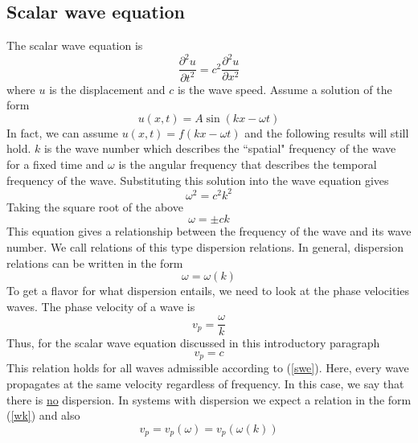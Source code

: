 \documentclass{article}
\begin{document}
\subsection{Scalar wave equation}
The scalar wave equation is 
\begin{equation} \label{swe}
\frac{\partial^2 u}{\partial t^2} = c^2 \frac{\partial^2 u}{\partial x^2}
\end{equation}
where $u$ is the displacement and $c$ is the wave speed. Assume a solution of 
the form
\begin{equation}
u(x,t) = A\sin(kx - \omega t)
\end{equation}
In fact, we can assume $u(x,t) = f(kx-\omega t)$ and the following results will 
still hold. $k$ is the wave number which describes the ``spatial" frequency of 
the wave for a fixed time and $\omega$ is the angular frequency that describes 
the temporal frequency of the wave. Substituting this solution into the wave 
equation gives
\begin{equation}
\omega^2 = c^2 k^2
\end{equation}
Taking the square root of the above
\begin{equation} \label{nd}
\omega = \pm c k
\end{equation}
This equation gives a relationship between the frequency of the wave and its 
wave number. We call relations of this type dispersion relations. In general, 
dispersion relations can be written in the form
\begin{equation} \label{wk}
\omega = \omega(k)
\end{equation}
To get a flavor for what dispersion entails, we need to look at the phase 
velocities waves. The phase velocity of a wave is
\begin{equation}
v_p = \frac{\omega}{k}
\end{equation}
Thus, for the scalar wave equation discussed in this introductory paragraph
\begin{equation}
v_p = c
\end{equation}
This relation holds for all waves admissible according to (\ref{swe}). Here, 
every wave propagates at the same velocity regardless of frequency. In this 
case, we say that there is \underline{no} dispersion. In systems with 
dispersion we expect a relation in the form (\ref{wk}) and also
\begin{equation}
v_p = v_p(\omega) = v_p(\omega(k))
\end{equation}
\end{document}
